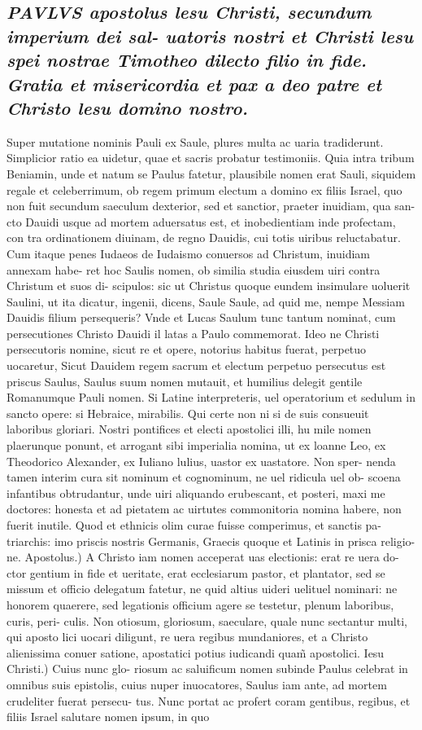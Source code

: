 \documentclass{article}
\begin{document}
\begin{pages}
\subsection*{\textit{\huge\textbf{P}\normalsize AVLVS apostolus lesu Christi, secundum imperium dei sal- uatoris nostri et Christi lesu spei nostrae Timotheo dilecto filio in fide. Gratia et misericordia et pax a deo patre et Christo lesu domino nostro. }}\pstart Super mutatione nominis Pauli ex Saule, plures multa ac uaria tradiderunt. Simplicior ratio ea uidetur, quae et sacris probatur testimoniis. Quia intra tribum Beniamin, unde et natum se Paulus fatetur, plausibile nomen erat Sauli, siquidem regale et celeberrimum, ob regem primum electum a domino ex filiis Israel, quo non fuit secundum saeculum dexterior, sed et sanctior, praeter inuidiam, qua san- cto Dauidi usque ad mortem aduersatus est, et inobedientiam inde profectam, con tra ordinationem diuinam, de regno Dauidis, cui totis uiribus reluctabatur. Cum itaque penes Iudaeos de Iudaismo conuersos ad Christum, inuidiam annexam habe- ret hoc Saulis nomen, ob similia studia eiusdem uiri contra Christum et suos di- scipulos: sic ut Christus quoque eundem insimulare uoluerit Saulini, ut ita dicatur, ingenii, dicens, Saule Saule, ad quid me, nempe Messiam Dauidis filium persequeris? Vnde et Lucas Saulum tunc tantum nominat, cum persecutiones Christo Dauidi il latas a Paulo commemorat. Ideo ne Christi persecutoris nomine, sicut re et opere, notorius habitus fuerat, perpetuo uocaretur, Sicut Dauidem regem sacrum et electum perpetuo persecutus est priscus Saulus, Saulus suum nomen mutauit, et humilius delegit gentile Romanumque Pauli nomen. Si Latine interpreteris, uel operatorium et sedulum in sancto opere: si Hebraice, mirabilis. Qui certe non ni si de suis consueuit laboribus gloriari. Nostri pontifices et electi apostolici illi, hu mile nomen plaerunque ponunt, et arrogant sibi imperialia nomina, ut ex loanne Leo, ex Theodorico Alexander, ex Iuliano lulius, uastor ex uastatore. Non sper- nenda tamen interim cura sit nominum et cognominum, ne uel ridicula uel ob- scoena infantibus obtrudantur, unde uiri aliquando erubescant, et posteri, maxi me doctores: honesta et ad pietatem ac uirtutes commonitoria nomina habere, non fuerit inutile. Quod et ethnicis olim curae fuisse comperimus, et sanctis pa- triarchis: imo priscis nostris Germanis, Graecis quoque et Latinis in prisca religio- ne. Apostolus.) A Christo iam nomen acceperat uas electionis: erat re uera do- ctor gentium in fide et ueritate, erat ecclesiarum pastor, et plantator, sed se missum et officio delegatum fatetur, ne quid altius uideri uelituel nominari: ne honorem quaerere, sed legationis officium agere se testetur, plenum laboribus, curis, peri- culis. Non otiosum, gloriosum, saeculare, quale nunc sectantur multi, qui aposto lici uocari diligunt, re uera regibus mundaniores, et a Christo alienissima conuer satione, apostatici potius iudicandi quam̃ apostolici. Iesu Christi.) Cuius nunc glo- riosum ac saluificum nomen subinde Paulus celebrat in omnibus suis epistolis, cuius nuper inuocatores, Saulus iam ante, ad mortem crudeliter fuerat persecu- tus. Nunc portat ac profert coram gentibus, regibus, et filiis Israel salutare nomen ipsum, in quo 
\end{pages}
\end{document}
